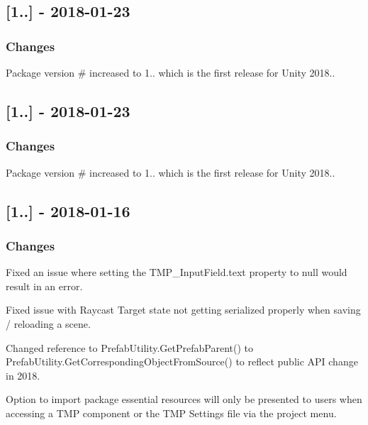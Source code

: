 \subsection*{\mbox{[}1..\mbox{]} -\/ 2018-\/01-\/23}

\subsubsection*{Changes}


\begin{DoxyItemize}
\item Package version \# increased to 1.. which is the first release for Unity 2018..
\end{DoxyItemize}

\subsection*{\mbox{[}1..\mbox{]} -\/ 2018-\/01-\/23}

\subsubsection*{Changes}


\begin{DoxyItemize}
\item Package version \# increased to 1.. which is the first release for Unity 2018..
\end{DoxyItemize}

\subsection*{\mbox{[}1..\mbox{]} -\/ 2018-\/01-\/16}

\subsubsection*{Changes}


\begin{DoxyItemize}
\item Fixed an issue where setting the T\+M\+P\+\_\+\+Input\+Field.\+text property to null would result in an error.
\item Fixed issue with Raycast Target state not getting serialized properly when saving / reloading a scene.
\item Changed reference to Prefab\+Utility.\+Get\+Prefab\+Parent() to Prefab\+Utility.\+Get\+Corresponding\+Object\+From\+Source() to reflect public A\+PI change in 2018.
\item Option to import package essential resources will only be presented to users when accessing a T\+MP component or the T\+MP Settings file via the project menu.
\end{DoxyItemize}

